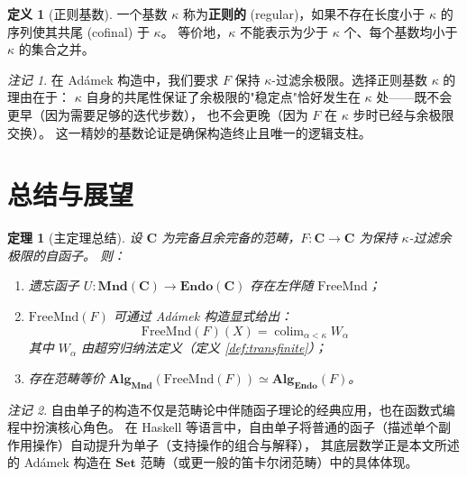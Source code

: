 \documentclass[UTF8,a4paper,12pt]{ctexart}
\theoremstyle{definition}
\newtheorem{definition}{定义}[section]
\theoremstyle{plain}
\newtheorem{theorem}{定理}[section]
\theoremstyle{remark}
\newtheorem{remark}{注记}[section]
\newcommand{\cat}[1]{\mathbf{#1}}
\newcommand{\Set}{\cat{Set}}
\newcommand{\colim}{\operatorname{colim}}
\newcommand{\Endo}{\mathbf{Endo}}
\newcommand{\Mnd}{\mathbf{Mnd}}
\newcommand{\FreeMnd}{\mathrm{FreeMnd}}
\newcommand{\Alg}{\mathbf{Alg}}
\begin{document}
\begin{definition}[正则基数]
一个基数 $\kappa$ 称为\textbf{正则的} (regular)，如果不存在长度小于 $\kappa$ 的序列使其共尾 (cofinal) 于 $\kappa$。
等价地，$\kappa$ 不能表示为少于 $\kappa$ 个、每个基数均小于 $\kappa$ 的集合之并。
\end{definition}

\begin{remark}
在 Adámek 构造中，我们要求 $F$ 保持 $\kappa$-过滤余极限。选择正则基数 $\kappa$ 的理由在于：
$\kappa$ 自身的共尾性保证了余极限的"稳定点"恰好发生在 $\kappa$ 处——既不会更早（因为需要足够的迭代步数），
也不会更晚（因为 $F$ 在 $\kappa$ 步时已经与余极限交换）。
这一精妙的基数论证是确保构造终止且唯一的逻辑支柱。
\end{remark}

\section{总结与展望}

\begin{theorem}[主定理总结]
设 $\cat{C}$ 为完备且余完备的范畴，$F: \cat{C} \to \cat{C}$ 为保持 $\kappa$-过滤余极限的自函子。
则：
\begin{enumerate}
    \item 遗忘函子 $U: \Mnd(\cat{C}) \to \Endo(\cat{C})$ 存在左伴随 $\FreeMnd$；
    \item $\FreeMnd(F)$ 可通过 Adámek 构造显式给出：
    \[
    \FreeMnd(F)(X) = \colim_{\alpha < \kappa} W_\alpha
    \]
    其中 $W_\alpha$ 由超穷归纳法定义（定义 \ref{def:transfinite}）；
    \item 存在范畴等价 $\Alg_{\Mnd}(\FreeMnd(F)) \simeq \Alg_{\Endo}(F)$。
\end{enumerate}
\end{theorem}

\begin{remark}
自由单子的构造不仅是范畴论中伴随函子理论的经典应用，也在函数式编程中扮演核心角色。
在 Haskell 等语言中，自由单子将普通的函子（描述单个副作用操作）自动提升为单子（支持操作的组合与解释），
其底层数学正是本文所述的 Adámek 构造在 $\Set$ 范畴（或更一般的笛卡尔闭范畴）中的具体体现。
\end{remark}
\end{document}

